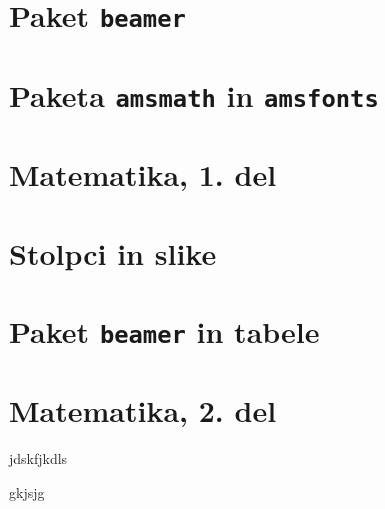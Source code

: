 \documentclass{beamer}
\begin{document}


\section{Paket \texttt{beamer}}

\section{Paketa \texttt{amsmath} in \texttt{amsfonts}}

\section[Matematika, 1. del\\\large{Analiza, logika, množice}]{Matematika, 1. del}

\section{Stolpci in slike}

\section{Paket \texttt{beamer} in tabele}

\section[Matematika, 2. del\\\large{Zaporedja, algebra, grupe}]{Matematika, 2. del}

\begin{frame}
    jdskfjkdls
\end{frame}

\begin{frame}
    gkjsjg
\end{frame}
\end{document}
